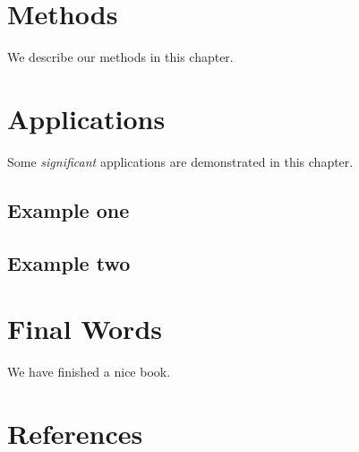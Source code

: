\documentclass[a4paper,12pt,oneside]{book}
\begin{document}
\chapter{Methods}\label{methods}

We describe our methods in this chapter.

\chapter{Applications}\label{applications}

Some \emph{significant} applications are demonstrated in this chapter.

\section{Example one}\label{example-one}

\section{Example two}\label{example-two}

\chapter{Final Words}\label{final-words}

We have finished a nice book.

\chapter*{References}\label{references}
\end{document}

